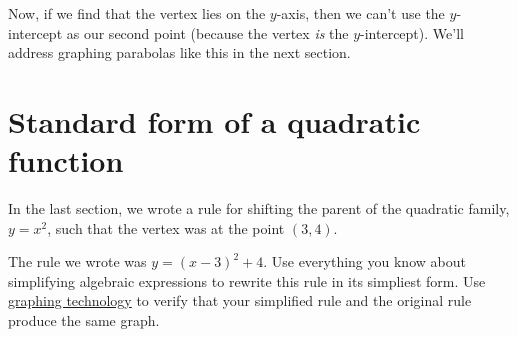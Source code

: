 \begin{figure}
\end{figure}

Now, if we find that the vertex lies on the $y$-axis, then we can't use the $y$-intercept as our second point (because the vertex \textit{is} the $y$-intercept). We'll address graphing parabolas like this in the next section.


\section{Standard form of a quadratic function}
\label{sec:standardformquad}

\begin{boxedexplore}
In the last section, we wrote a rule for shifting the parent of the quadratic family, $y=x^2$, such that the vertex was at the point $(3, 4)$.

\begin{center}
\end{center}

The rule we wrote was $y=(x-3)^2 + 4$. Use everything you know about simplifying algebraic expressions to rewrite this rule in its simpliest form. Use \href{https://www.desmos.com/}{graphing technology} to verify that your simplified rule and the original rule produce the same graph.
\end{boxedexplore}

